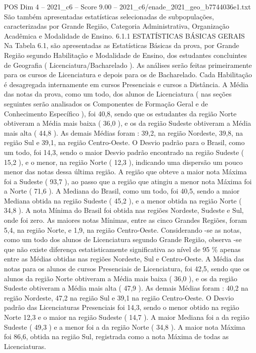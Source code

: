 \begin{textsample}{POS Dim 4 – 2021\_c6 – Score 9.00 – 2021\_c6/enade\_2021\_geo\_b7744036e1.txt}
São também apresentadas estatísticas selecionadas de subpopulações, caracterizadas por Grande Região, Categoria Administrativa, Organização Acadêmica e Modalidade de Ensino. 6.1.1 ESTATÍSTICAS BÁSICAS GERAIS Na Tabela 6.1, são apresentadas as Estatísticas Básicas da prova, por Grande Região segundo Habilitação e Modalidade de Ensino, dos estudantes concluintes de Geografia ( Licenciatura/Bacharelado ).
As análises serão feitas primeiramente para os cursos de Licenciatura e depois para os de Bacharelado.
Cada Habilitação é desagregada internamente em cursos Presenciais e cursos a Distância.
A Média das notas da prova, como um todo, dos alunos de Licenciatura ( nas seções seguintes serão analisados os Componentes de Formação Geral e de Conhecimento Específico ), foi 40,8, sendo que os estudantes da região Norte obtiveram a Média mais baixa ( 36,0 ), e os da região Sudeste obtiveram a Média mais alta ( 44,8 ).
As demais Médias foram : 39,2, na região Nordeste, 39,8, na região Sul e 39,1, na região Centro-Oeste.
O Desvio padrão para o Brasil, como um todo, foi 14,3, sendo o maior Desvio padrão encontrado na região Sudeste ( 15,2 ), e o menor, na região Norte ( 12,3 ), indicando uma dispersão um pouco menor das notas dessa última região.
A região que obteve a maior nota Máxima foi a Sudeste ( 93,7 ), ao passo que a região que atingiu a menor nota Máxima foi a Norte ( 71,6 ).
A Mediana do Brasil, como um todo, foi 40,5, sendo a maior Mediana obtida na região Sudeste ( 45,2 ), e a menor obtida na região Norte ( 34,8 ).
A nota Mínima do Brasil foi obtida nas regiões Nordeste, Sudeste e Sul, onde foi zero.
As maiores notas Mínimas, entre as cinco Grandes Regiões, foram 5,4, na região Norte, e 1,9, na região Centro-Oeste.
Considerando -se as notas, como um todo dos alunos de Licenciatura segundo Grande Região, observa -se que não existe diferença estatisticamente significativa ao nível de 95 \% apenas entre as Médias obtidas nas regiões Nordeste, Sul e Centro-Oeste.
A Média das notas para os alunos de cursos Presenciais de Licenciatura, foi 42,5, sendo que os alunos da região Norte obtiveram a Média mais baixa ( 36,0 ), e os da região Sudeste obtiveram a Média mais alta ( 47,9 ).
As demais Médias foram : 40,2 na região Nordeste, 47,2 na região Sul e 39,1 na região Centro-Oeste.
O Desvio padrão das Licenciaturas Presenciais foi 14,3, sendo o menor obtido na região Norte 12,3 e o maior na região Sudeste ( 14,7 ).
A maior Mediana foi a da região Sudeste ( 49,3 ) e a menor foi a da região Norte ( 34,8 ).
A maior nota Máxima foi 86,6, obtida na região Sul, registrada como a nota Máxima de todas as Licenciaturas.

\end{textsample}
